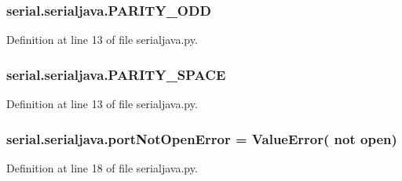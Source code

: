 \subsubsection[{\texorpdfstring{P\+A\+R\+I\+T\+Y\+\_\+\+O\+DD}{PARITY_ODD}}]{\setlength{\rightskip}{0pt plus 5cm}serial.\+serialjava.\+P\+A\+R\+I\+T\+Y\+\_\+\+O\+DD}\hypertarget{namespaceserial_1_1serialjava_a5abe5d68cd7b6b224b6f8ba475e89078}{}\label{namespaceserial_1_1serialjava_a5abe5d68cd7b6b224b6f8ba475e89078}


Definition at line 13 of file serialjava.\+py.

\subsubsection[{\texorpdfstring{P\+A\+R\+I\+T\+Y\+\_\+\+S\+P\+A\+CE}{PARITY_SPACE}}]{\setlength{\rightskip}{0pt plus 5cm}serial.\+serialjava.\+P\+A\+R\+I\+T\+Y\+\_\+\+S\+P\+A\+CE}\hypertarget{namespaceserial_1_1serialjava_aaead0f60fb0518b56be4fa485680141e}{}\label{namespaceserial_1_1serialjava_aaead0f60fb0518b56be4fa485680141e}


Definition at line 13 of file serialjava.\+py.

\subsubsection[{\texorpdfstring{port\+Not\+Open\+Error}{portNotOpenError}}]{\setlength{\rightskip}{0pt plus 5cm}serial.\+serialjava.\+port\+Not\+Open\+Error = Value\+Error( not open\textquotesingle{})}\hypertarget{namespaceserial_1_1serialjava_ad04063ae4ca2414f058a5040e70b49f0}{}\label{namespaceserial_1_1serialjava_ad04063ae4ca2414f058a5040e70b49f0}


Definition at line 18 of file serialjava.\+py.

